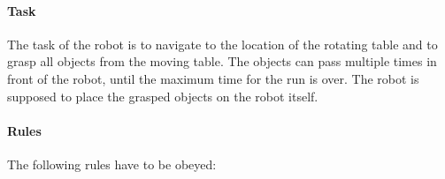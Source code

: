 \paragraph{Task}
The task of the robot is to navigate to the location of the rotating table and to grasp all objects from the moving table. The objects can pass multiple times in front of the robot, until the maximum time for the run is over. The robot is supposed to place the grasped objects on the robot itself.




%



\paragraph{Rules}
The following rules have to be obeyed:

